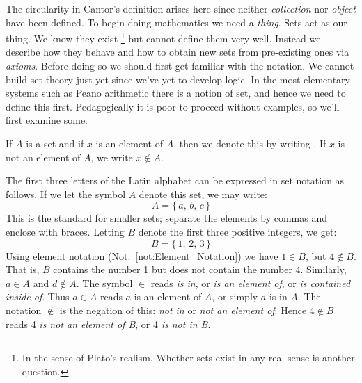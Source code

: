         The circularity in Cantor's definition arises here since neither
        \textit{collection} nor \textit{object} have been defined. To
        begin doing mathematics we need a \textit{thing}. Sets act as our thing.
        We know they exist%
        \footnote{%
            In the sense of Plato's realism.%
            Whether sets exist in any real sense is another question.
        }
        but cannot define them very well. Instead we describe how they behave
        and how to obtain new sets from pre-existing ones via \textit{axioms}.
        Before doing so we should first get familiar with the notation. We
        cannot build set theory just yet since we've yet to develop logic. In
        the most elementary systems such as Peano arithmetic there is a notion
        of set, and hence we need to define this first. Pedagogically it is poor
        to proceed without examples, so we'll first examine some.
        \begin{notation}
            \label{not:Element_Notation}%
            If $A$ is a \gls{set} and if $x$ is an element
            of $A$, then we denote this by writing
            . If $x$ is not an element
            of $A$, we write $x\notin{A}$.%
        \end{notation}
        \begin{example}
            The first three letters of the Latin alphabet can be expressed in
            set notation as follows. If we let the symbol $A$ denote this set, we
            may write:
            \begin{equation}
                A=\{\,a,\,b,\,c\,\}
            \end{equation}
            This is the standard for smaller sets; separate the elements by
            commas and enclose with braces. Letting $B$ denote the first three
            positive integers, we get:
            \begin{equation}
                B=\{\,1,\,2,\,3\,\}
            \end{equation}
            Using element notation (Not.~\ref{not:Element_Notation}) we have
            $1\in{B}$, but $4\notin{B}$. That is, $B$ contains the number 1 but
            does not contain the number 4. Similarly, $a\in{A}$ and
            $d\notin{A}$. The symbol $\in$ reads \textit{is in}, or
            \textit{is an element of}, or \textit{is contained inside of}. Thus
            $a\in{A}$ reads $a$ is an element of $A$, or simply $a$ is in $A$.
            The notation $\notin$ is the negation of this: \textit{not in} or
            \textit{not an element of}. Hence $4\notin{B}$ reads
            4\textit{ is not an element of B}, or 4\textit{ is not in B}.
        \end{example}
